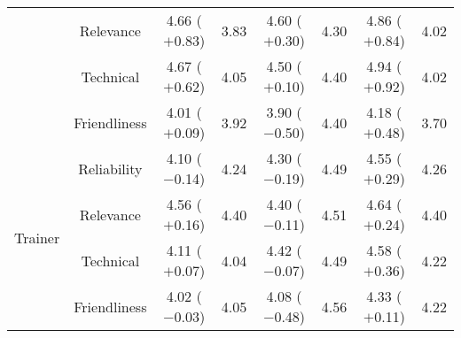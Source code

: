 \begin{table*}
\begin{tabular}{c|c|cc|cc|cc}
& Relevance & 4.66 ($+$0.83) & 3.83 & 4.60 ($+$0.30) & 4.30 & 4.86 ($+$0.84) & 4.02 \\
& Technical & 4.67 ($+$0.62) & 4.05 & 4.50 ($+$0.10) & 4.40 & 4.94 ($+$0.92) & 4.02 \\
& Friendliness & 4.01 ($+$0.09) & 3.92 & 3.90 ($-$0.50) & 4.40 & 4.18 ($+$0.48) & 3.70 \\
\midrule
\multirow{4}{*}{Trainer} & Reliability & 4.10 ($-$0.14) & 4.24 & 4.30 ($-$0.19) & 4.49 & 4.55 ($+$0.29) & 4.26 \\
& Relevance & 4.56 ($+$0.16) & 4.40 & 4.40 ($-$0.11) & 4.51 & 4.64 ($+$0.24) & 4.40 \\
& Technical & 4.11 ($+$0.07) & 4.04 & 4.42 ($-$0.07) & 4.49 & 4.58 ($+$0.36) & 4.22 \\
 & Friendliness & 4.02 ($-$0.03) & 4.05 & 4.08 ($-$0.48) & 4.56 & 4.33 ($+$0.11) & 4.22 \\
\bottomrule \bottomrule
\end{tabular}
\end{table*}

